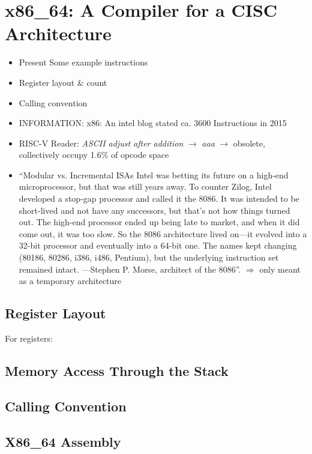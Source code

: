 \newpage
\section{x86\_64: A Compiler for a CISC Architecture}


\begin{itemize}
	\item Present Some example instructions
	\item Register layout \& count
	\item Calling convention
	\item INFORMATION: x86: An intel blog stated ca. 3600 Instructions in 2015 \cite{Rodgers2017}
    \item RISC-V Reader: \emph{ASCII adjust after addition} $\rightarrow$ \emph{aaa} $\rightarrow$ obsolete, collectively occupy 1.6\% of opcode space\cite[p.~4]{Patterson2017}
	\item
	      \enquote{Modular vs. Incremental ISAs Intel was betting its future on a high-end microprocessor, but that was still years away.
		      To counter Zilog, Intel developed a stop-gap processor and called it the 8086. It was intended to be short-lived and not have any successors,
		      but that’s not how things turned out. The high-end processor ended up being late to market, and when it did come out, it was too slow.
		      So the 8086 architecture lived on—it evolved into a 32-bit processor and eventually into a 64-bit one.
		      The names kept changing (80186, 80286, i386, i486, Pentium), but the underlying instruction set remained intact. —Stephen P. Morse, architect of the 8086}\cite{Morse2017}.
              $\Rightarrow$ only meant as a temporary architecture
\end{itemize}

\subsection{Register Layout}

For registers: \cite[p.~7]{Kusswurm2018}


\subsection{Memory Access Through the Stack}

\subsection{Calling Convention}

\subsection{X86\_64 Assembly}

